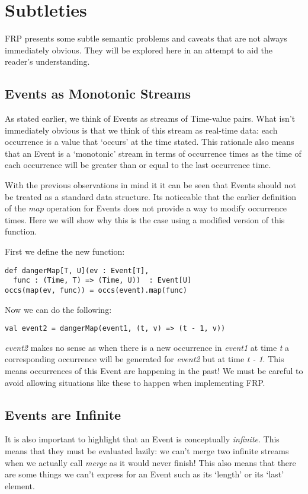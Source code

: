   \section{Subtleties}
    FRP presents some subtle semantic problems and caveats that are not always immediately obvious.
    They will be explored here in an attempt to aid the reader's understanding.
     
    \subsection{Events as Monotonic Streams}
      As stated earlier, we think of Events as streams of Time-value pairs. What isn't immediately
      obvious is that we think of this stream as real-time data: each occurrence is a value that
      `occurs' at the time stated. This rationale also means that an Event is a `monotonic' stream in terms of
      occurrence times as the time of each occurrence will be greater than or equal to the last occurrence
      time.
      
      With the previous observations in mind it it can be seen that Events should not be treated as a
      standard data structure. Its noticeable that the earlier definition of the \emph{map} operation for
      Events does not provide a way to modify occurrence times. Here we will show why this is
      the case using a modified version of this function.
      
      First we define the new function:
      
\begin{verbatim}
def dangerMap[T, U](ev : Event[T], 
  func : (Time, T) => (Time, U))  : Event[U]
occs(map(ev, func)) = occs(event).map(func)
\end{verbatim}

      Now we can do the following:
      
\begin{verbatim}
val event2 = dangerMap(event1, (t, v) => (t - 1, v))
\end{verbatim}

      \emph{event2} makes no sense as when there is a new occurrence in \emph{event1} at time 
      \emph{t} a corresponding occurrence will be generated for \emph{event2} but at time 
      \emph{t - 1}. This means occurrences of this Event are happening in the past! We must
      be careful to avoid allowing situations like these to happen when implementing FRP.
      
    \subsection{Events are Infinite}  
      It is also important to highlight that an Event is conceptually \emph{infinite}. This means
      that they must be evaluated lazily: we can't merge two infinite streams when we actually
      call \emph{merge} as it would never finish! This also means that there are some things we
      can't express for an Event such as its `length' or its `last' element.
    
